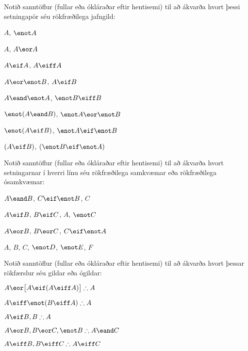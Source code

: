 \practiceproblems
\problempart
Notið sanntöflur (fullar eða ókláraðar eftir hentisemi) til að ákvarða hvort þessi setningapör séu rökfræðilega jafngild:

\begin{earg}
\item $A$, $\enot A$ %
\item $A$, $A \eor A$ %
\item $A\eif A$, $A \eiff A$ %
\item $A \eor \enot B$, $A\eif B$ %
\item $A \eand \enot A$, $\enot B \eiff B$ %
\item $\enot(A \eand B)$, $\enot A \eor \enot B$ %
\item $\enot(A \eif B)$, $\enot A \eif \enot B$ %
\item $(A \eif B)$, $(\enot B \eif \enot A)$ %
\end{earg}

\problempart
Notið sanntöflur (fullar eða ókláraðar eftir hentisemi) til að ákvarða hvort setningarnar í hverri línu séu rökfræðilega samkvæmar eða rökfræðilega ósamkvæmar:

\begin{earg}
\item $A \eand B$, $C\eif \enot B$, $C$ %
\item $A\eif B$, $B\eif C$, $A$, $\enot C$ %
\item $A \eor B$, $B\eor C$, $C\eif \enot A$ %
\item $A$, $B$, $C$, $\enot D$, $\enot E$, $F$ %
\end{earg}

\problempart
Notið sanntöflur (fullar eða ókláraðar eftir hentisemi) til að ákvarða hvort þessar rökfærslur séu gildar eða ógildar:

\begin{earg}
\item $A\eor\bigl[A\eif(A\eiff A)\bigr] \therefore A$ %
\item $A\eiff\enot(B\eiff A) \therefore A$ %
\item $A\eif B, B \therefore A$ %
\item $A\eor B, B\eor C, \enot B \therefore A \eand C$ %
\item $A\eiff B, B\eiff C \therefore A\eiff C$ %
\end{earg}